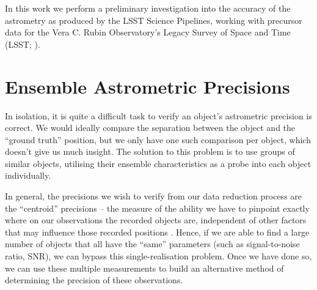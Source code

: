 \documentclass[SE,authoryear,toc]{lsstdoc}
\begin{document}
In this work we perform a preliminary investigation into the accuracy of the astrometry as produced by the LSST Science Pipelines, working with precursor data for the Vera C. Rubin Observatory's Legacy Survey of Space and Time (LSST; \citealp{Ivezic2019}).

\section{Ensemble Astrometric Precisions}
In isolation, it is quite a difficult task to verify an object's astrometric precision is correct.
We would ideally compare the separation between the object and the ``ground truth'' position, but we only have one such comparison per object, which doesn't give us much insight.
The solution to this problem is to use groups of similar objects, utilising their ensemble characteristics as a probe into each object individually.

In general, the precisions we wish to verify from our data reduction process are the ``centroid'' precisions -- the measure of the ability we have to pinpoint exactly where on our observations the recorded objects are, independent of other factors that may influence those recorded positions \citep{2017MNRAS.468.2517W,2018MNRAS.481.2148W,Wilson2023}.
Hence, if we are able to find a large number of objects that all have the ``same'' parameters (such as signal-to-noise ratio, SNR), we can bypass this single-realisation problem.
Once we have done so, we can use these multiple measurements to build an alternative method of determining the precision of these observations.
\end{document}
